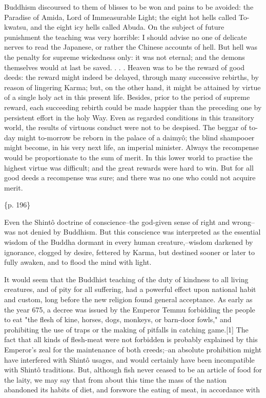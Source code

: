 Buddhism discoursed to them of blisses to be won and pains to be avoided: the Paradise of Amida, Lord of Immeasurable Light; the eight hot hells called To-kwatsu, and the eight icy hells called Abuda. On the subject of future punishment the teaching was very horrible: I should advise no one of delicate nerves to read the Japanese, or rather the Chinese accounts of hell. But hell was the penalty for supreme wickedness only: it was not eternal; and the demons themselves would at last be saved. . . . Heaven was to be the reward of good deeds: the reward might indeed be delayed, through many successive rebirths, by reason of lingering Karma; but, on the other hand, it might be attained by virtue of a single holy act in this present life. Besides, prior to the period of supreme reward, each succeeding rebirth could be made happier than the preceding one by persistent effort in the holy Way. Even as regarded conditions in this transitory world, the results of virtuous conduct were not to be despised. The beggar of to-day might to-morrow be reborn in the palace of a daimyô; the blind shampooer might become, in his very next life, an imperial minister. Always the recompense would be proportionate to the sum of merit. In this lower world to practise the highest virtue was difficult; and the great rewards were hard to win. But for all good deeds a recompense was sure; and there was no one who could not acquire merit.

\{p. 196\}

Even the Shintô doctrine of conscience--the god-given sense of right and wrong--was not denied by Buddhism. But this conscience was interpreted as the essential wisdom of the Buddha dormant in every human creature,--wisdom darkened by ignorance, clogged by desire, fettered by Karma, but destined sooner or later to fully awaken, and to flood the mind with light.



It would seem that the Buddhist teaching of the duty of kindness to all living creatures, and of pity for all suffering, had a powerful effect upon national habit and custom, long before the new religion found general acceptance. As early as the year 675, a decree was issued by the Emperor Temmu forbidding the people to eat "the flesh of kine, horses, dogs, monkeys, or barn-door fowls," and prohibiting the use of traps or the making of pitfalls in catching game.[1] The fact that all kinds of flesh-meat were not forbidden is probably explained by this Emperor's zeal for the maintenance of both creeds;--an absolute prohibition might have interfered with Shintô usages, and would certainly have been incompatible with Shintô traditions. But, although fish never ceased to be an article of food for the laity, we may say that from about this time the mass of the nation abandoned its habits of diet, and forswore the eating of meat, in accordance with

